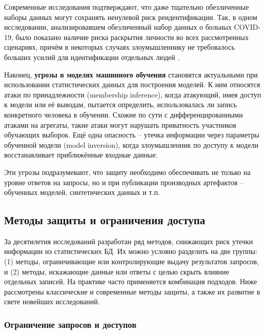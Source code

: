 Современные исследования подтверждают, что даже тщательно обезличенные наборы данных могут
сохранять ненулевой риск реидентификации. Так, в одном исследовании, анализировавшем
обезличенный набор данных о больных COVID-19, было показано наличие риска раскрытия
личности во всех рассмотренных сценариях, причём в некоторых случаях злоумышленнику не
требовалось больших усилий для идентификации отдельных людей \autocite{journals-plos-org}.

Наконец, \textbf{угрозы в моделях машинного обучения} становятся актуальными при
использовании статистических данных для построения моделей. К ним относятся атаки по
принадлежности (membership inference), когда атакующий, имея доступ к модели или её
выводам, пытается определить, использовалась ли запись конкретного человека в обучении.
Схожие по сути с дифференцированными атаками на агрегаты, такие атаки могут нарушать
приватность участников обучающих выборок. Ещё одна опасность – утечка информации через
параметры обученной модели (model inversion), когда злоумышленник по доступу к модели
восстанавливает приближённые входные данные.

Эти угрозы подразумевают, что защиту необходимо обеспечивать не только на уровне ответов
на запросы, но и при публикации производных артефактов – обученных моделей, синтетических
данных и т.п.

\subsection{Методы защиты и ограничения доступа}
За десятилетия исследований разработан ряд методов, снижающих риск утечки информации из статистических БД. Их можно
условно разделить на две группы: (1) методы, ограничивающие или контролирующие выдачу результатов запросов, и (2)
методы, искажающие данные или ответы с целью скрыть влияние отдельных записей. На практике часто применяется комбинация
подходов. Ниже рассмотрены классические и современные методы защиты, а также их развитие в свете новейших исследований.

\subsubsection{Ограничение запросов и доступов}


